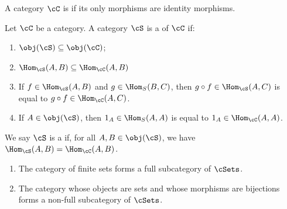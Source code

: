     \begin{definition}
        A category $\cC$ is  if its only morphisms are identity morphisms.
    \end{definition}

    \begin{definition}
        Let $\cC$ be a category. A category $\cS$ is a  of $\cC$ if:
            \begin{enumerate}[label = (\arabic*)]
                \item $\obj(\cS) \subseteq \obj(\cC)$;
                \item $\Hom_\cS(A,B) \subseteq \Hom_\cC(A,B)$
                \item If $f \in \Hom_\cS(A,B)$ and $g \in \Hom_S(B,C)$, then $g \circ f \in \Hom_\cS(A,C)$ is equal to $g \circ f \in \Hom_\cC(A,C)$.
                \item If $A \in \obj(\cS)$, then $1_A \in \Hom_S(A,A)$ is equal to $1_A \in \Hom_\cC(A,A)$.
            \end{enumerate}
        We say $\cS$ is a  if, for all $A,B \in \obj(\cS)$, we have $\Hom_\cS(A,B) = \Hom_\cC(A,B)$.
    \end{definition}

    \begin{example}
        \phantom{a}
        \begin{enumerate}[label = (\arabic*)]
            \item The category of finite sets forms a full subcategory of $\cSets$.
            \item The category whose objects are sets and whose morphisms are bijections forms a non-full subcategory of $\cSets$.
        \end{enumerate}
    \end{example}
